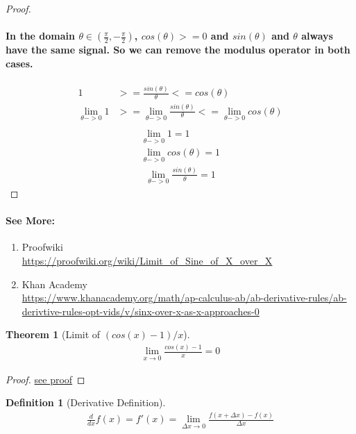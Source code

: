 \documentclass{article}
\newtheorem{theorem}{Theorem}[section]
\theoremstyle{definition}
\newtheorem{definition}{Definition}[theorem]
\begin{document}
\begin{proof}
	\paragraph{In the domain $\theta \in (\frac{\pi}{2},-\frac{\pi}{2})$, $cos(\theta) >= 0$ and $sin(\theta)$ and $\theta$ always have the same signal. So we can remove the modulus operator in both cases.}
	\begin{align*}
		1 &>=  \frac{sin(\theta)}{\theta} <= cos(\theta)\\
		\lim_{\theta->0}{1} &>= \lim_{\theta->0}{\frac{sin(\theta)}{\theta}} <= \lim_{\theta->0}{cos(\theta)}\\
	\end{align*}
	\begin{align*}
		\lim_{\theta->0}{1} = 1\\
		\lim_{\theta->0}{cos(\theta)} = 1
	\end{align*}
	\begin{align*}
		\lim_{\theta->0}{\frac{sin(\theta)}{\theta}} = 1
	\end{align*}
\end{proof}
\paragraph{See More:}
\begin{enumerate}
	\item {Proofwiki \\
\url{https://proofwiki.org/wiki/Limit_of_Sine_of_X_over_X}}
	\item {Khan Academy\\
\url{https://www.khanacademy.org/math/ap-calculus-ab/ab-derivative-rules/ab-derivtive-rules-opt-vids/v/sinx-over-x-as-x-approaches-0}}
\end{enumerate}

\clearpage
\begin{theorem}[Limit of $(cos(x)-1)/x$]\label{theorems:limits:cosxminusoneoverx}
	\begin{align*}
	\lim_{x \to 0} \frac {cos(x)-1} {x} = 0
	\end{align*}
\end{theorem}
\begin{proof}
	\href{https://proofwiki.org/wiki/Limit_of_(Cosine_(X)_-_1)_over_X}{see proof}
\end{proof}

\begin{definition}[Derivative Definition]\label{definitions:derivative}
\begin{align*}
\frac {d}{dx} f(x) = f'(x) = \lim_{\Delta x \to 0} {\frac {f(x+\Delta x) - f(x)} {\Delta x}}
\end{align*}
\end{definition}
\end{document}
